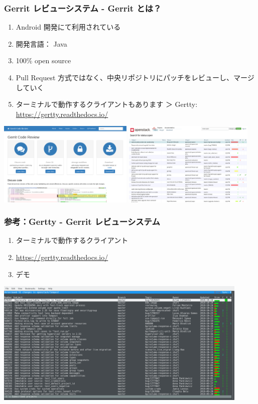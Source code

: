 \documentclass[aspectratio=169,11pt,hyperref={colorlinks=true}]{beamer}
\begin{document}
\begin{frame}
  \frametitle{Gerrit レビューシステム - Gerrit とは？}
  \begin{enumerate}
    \item Android 開発にて利用されている
    \item 開発言語： Java
    \item 100\% open source
    \item Pull Request 方式ではなく、中央リポジトリにパッチをレビューし、マージしていく
    \item ターミナルで動作するクライアントもあります ＞ Gertty: \url{https://gertty.readthedocs.io/}
  \end{enumerate}
  \centering
  \includegraphics[height=40mm]{images/gerritcodereview-com.png}
  \includegraphics[height=40mm]{images/review-openstack-org.png}
\end{frame}

\begin{frame}
  \frametitle{参考：Gertty - Gerrit レビューシステム }
  \begin{enumerate}
    \item ターミナルで動作するクライアント
    \item \url{https://gertty.readthedocs.io/}
    \item デモ
  \end{enumerate}
  \centering
  \includegraphics[height=60mm]{images/gertty.png}
\end{frame}
\end{document}
